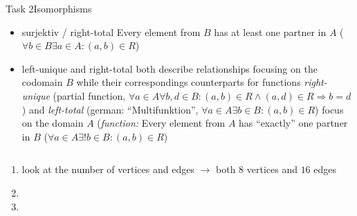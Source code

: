 \begin{frame}[allowframebreaks]{Task 2}{Isomorphisms}
\begin{requirementsnoinc}
\begin{itemize}
\begin{itemize}
        \item \alert{surjektiv / right-total} Every element from $B$ has \alert{at least} one partner in $A$ ($\forall b \in B \exists a \in A:(a, b) \in R$)
        \item \alert{left-unique} and \alert{right-total} both describe relationships focusing on the \alert{codomain} $B$ while their correspondings counterparts for functions \textit{right-unique } (partial function, $\forall a \in A \forall b, d \in B:(a, b) \in R \wedge(a, d) \in R \Rightarrow b=d$) and \textit{left-total } (german: \enquote{Multifunktion}, $\forall a \in A \exists b \in B:(a, b) \in R$) focus on the domain $A$ (\textit{function:} Every element from $A$ has \enquote{exactly} one partner in $B$ ($\forall a \in A \exists ! b \in B:(a, b) \in R$)
      \end{itemize}
    \end{itemize}
  \end{requirementsnoinc}
  \begin{solutionnoinc}
    \begin{columns}
      \begin{column}{0.5\textwidth}
      \end{column}
      \begin{column}{0.5\textwidth}
      \end{column}
    \end{columns}
    \vspace{0.5cm}
    \begin{enumerate}
      \item look at the \alert{number} of \alert{vertices} and \alert{edges} $\rightarrow$ both $8$ vertices and $16$ edges
      \item[]
      \item[]
    \end{enumerate}
  \end{solutionnoinc}
  \begin{solutionnoinc}
    \begin{columns}
      \begin{column}{0.5\textwidth}
      \end{column}
      \begin{column}{0.5\textwidth}
      \end{column}
    \end{columns}
    \vspace{0.5cm}

\end{solutionnoinc}
\end{frame}

